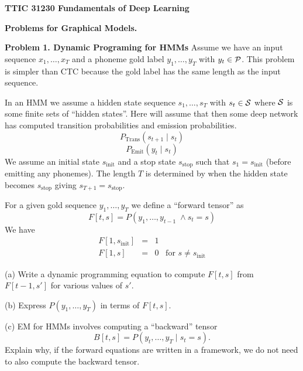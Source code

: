 \documentclass{article}
\newcommand{\solution}[1]{}
\begin{document}
\centerline{\bf TTIC 31230 Fundamentals of Deep Learning}

\bigskip

\centerline{\bf Problems for Graphical Models.}

\bigskip

\bigskip
{\bf Problem 1. Dynamic Programing for HMMs}  Assume we have an input sequence
$x_1,\ldots,x_T$ and a phoneme gold label $y_1,\ldots,y_T$ with $y_t
\in {\cal P}$.  This problem is simpler than CTC because the gold
label has the same length as the input sequence.

\medskip
In an HMM we assume a hidden state sequence $s_1,\ldots,s_T$
with $s_t \in {\cal S}$ where ${\cal S}$ is some finite sets of ``hidden states''.  Here will assume that then
some deep network has computed transition probabilities and emission probabilities.
$$P_{\mathrm{Trans}}(s_{t+1}\;|\; s_t)$$
$$P_{\mathrm{Emit}}(y_t\;|\;s_t)$$
We assume an initial state $s_{\mathrm{init}}$ and a stop state $s_{\mathrm{stop}}$ such that $s_1= s_{\mathrm{init}}$
(before emitting any phonemes). The length $T$ is determined
by when the hidden state becomes $s_{\mathrm{stop}}$ giving $s_{T+1} = s_{\mathrm{stop}}$. 

\medskip
For a given gold sequence $y_1,\ldots,y_T$ we define a ``forward tensor'' as
$$F[t,s] = P(y_1,\ldots,y_{t-1}\;\wedge s_t = s)$$
We have
\begin{eqnarray*}
  F[1,s_{\mathrm{init}}] & = & 1 \\
  F[1,s] & = & 0 \;\;\;\mbox{for $s  \not = s_{\mathrm{init}}$}
\end{eqnarray*}

\medskip
(a) Write a dynamic programming equation to compute $F[t,s]$ from $F[t-1,s']$ for various values of $s'$.

\solution{
  $$F[t,s] = \sum_{s'}\;F[t-1,s']P_{\mathrm{Emit}}(y_{t-1}|s')P_{\mathrm{Trans}}(s|s')$$
}


\medskip
(b) Express $P(y_1,\ldots,y_T)$ in terms of $F[t,s]$.

\solution{
  $$P(y_1,\ldots y_T) = F[T+1,s_{\mathrm{stop}}]$$
}

\medskip
(c) EM for HMMs involves computing a ``backward'' tensor
$$B[t,s] = P(y_t,\ldots,y_T\;|\;s_t=s).$$
Explain why, if the forward equations are written in a framework,
we do not need to also compute the backward tensor.

\solution{
  Once we have expressed the loss $- \ln P(y_1,\ldots,y_T)$ in a framework we can train the model by SGD using the framework's implementation of back-propagation.
  Nothing more is needed.
}
\end{document}
